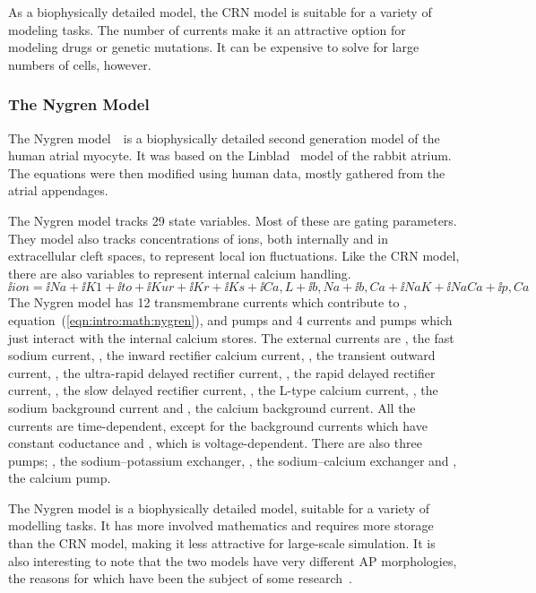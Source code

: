 As a biophysically detailed model, the CRN model is suitable for a variety of
modeling tasks.
The number of currents make it an attractive option for modeling drugs or
genetic mutations.
It can be expensive to solve for large numbers of cells, however.

\subsubsection{The Nygren Model}

The Nygren model~\cite{Nygren1998}\ is a biophysically detailed second
generation model of the human atrial myocyte.
It was based on the Linblad~\cite{Lindblad1996} model of the rabbit atrium.
The equations were then modified using human data, mostly gathered from the
atrial appendages.

The Nygren model tracks 29 state variables.
Most of these are gating parameters.
They model also tracks concentrations of ions, both internally and in
extracellular cleft spaces, to represent local ion fluctuations.
Like the CRN model, there are also variables to represent internal calcium
handling.
\begin{equation}
\label{eqn:intro:math:nygren}
\ii{ion} = \ii{Na} + \ii{K1} + \ii{to} + \ii{Kur} + \ii{Kr} + \ii{Ks} +
\ii{Ca,L} + \ii{b,Na} + \ii{b,Ca} + \ii{NaK} + \ii{NaCa} + \ii{p,Ca}
\end{equation}
The Nygren model has 12 transmembrane currents which contribute to ,
equation~(\ref{eqn:intro:math:nygren}), and pumps and 4 currents and
pumps which just interact with the internal calcium stores.
The external currents are , the fast sodium current, , the inward
rectifier calcium current, , the transient outward current, , the
ultra-rapid delayed rectifier current, , the rapid delayed rectifier
current, , the slow delayed rectifier current, , the L-type
calcium current, , the sodium background current and , the
calcium background current.
All the currents are time-dependent, except for the background currents which
have constant coductance and , which is voltage-dependent.
There are also three pumps; , the sodium--potassium exchanger,
, the sodium--calcium exchanger and , the calcium pump.

The Nygren model is a biophysically detailed model, suitable for a variety of
modelling tasks.
It has more involved mathematics and requires more storage than the CRN model,
making it less attractive for large-scale simulation.
It is also interesting to note that the two models have very different
AP morphologies, the reasons for which have been the subject of some
research~\cite{Nygren2001,Syed2005,Cherry2008}.

